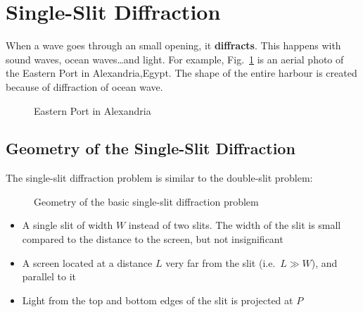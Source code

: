 \section{Single-Slit Diffraction}

When a wave goes through an small opening, it \textbf{diffracts}. This happens
with sound waves, ocean waves\ldots and light. For example,
Fig.~\ref{fig:alexandria} is an aerial photo of the Eastern Port in
Alexandria,Egypt. The shape of the entire harbour is created because of
diffraction of ocean wave.
\begin{figure}[ht]
  \centering
  \caption{Eastern Port in Alexandria}
  \label{fig:alexandria}
\end{figure}






\subsection{Geometry of the Single-Slit Diffraction}
The single-slit diffraction problem is similar to the double-slit problem:
\begin{figure}[ht]
  \centering
  \caption{Geometry of the basic single-slit diffraction problem}
  \label{fig:basic-1-slit}
\end{figure}
\begin{itemize}
\item A single slit of width $W$ instead of two slits. The width of the slit
  is small compared to the distance to the screen, but not insignificant
\item A screen located at a distance $L$ very far from the slit (i.e.\
  $L\gg W$), and parallel to it
\item Light from the top and bottom edges of the slit is projected at $P$
\end{itemize}



